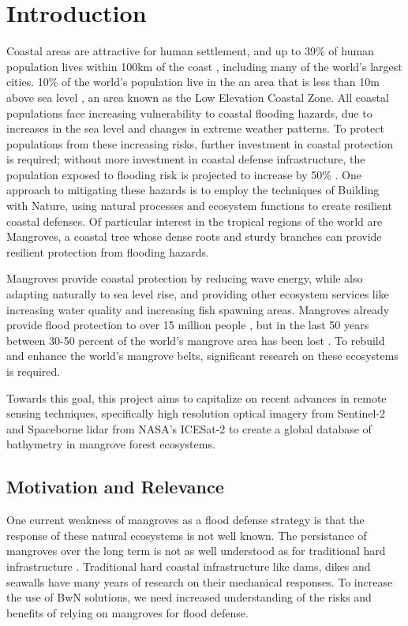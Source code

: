 \chapter{Introduction}

Coastal areas are attractive for human settlement, and up to 39\% of human population lives within 100km of the coast \parencite{Magdalena2021}, including many of the world's largest cities. 10\% of the world's population live in the an area that is less than 10m above sea level \parencite{Neumann2015,Lichter2011}, an area known as the Low Elevation Coastal Zone. All coastal populations face increasing vulnerability to coastal flooding hazards, due to increases in the sea level and changes in extreme weather patterns. To protect populations from these increasing risks, further investment in coastal protection is required; without more investment in coastal defense infrastructure, the population exposed to flooding risk is projected to increase by 50\% \Parencite{Kirezci2020}. One approach to mitigating these hazards is to employ the techniques of Building with Nature, using natural processes and ecosystem functions to create resilient coastal defenses. Of particular interest in the tropical regions of the world are Mangroves, a coastal tree whose dense roots and sturdy branches can provide resilient protection from flooding hazards.

Mangroves provide coastal protection by reducing wave energy, while also adapting naturally to sea level rise, and providing other ecosystem services like increasing water quality and increasing fish spawning areas. Mangroves already provide flood protection to over 15 million people \parencite{Menendez2020}, but in the last 50 years between 30-50 percent of the world's mangrove area has been lost \parencite{Goldberg2020}. To rebuild and enhance the world's mangrove belts, significant research on these ecosystems is required.

Towards this goal, this project aims to capitalize on recent advances in remote sensing techniques, specifically high resolution optical imagery from Sentinel-2 and Spaceborne lidar from NASA's ICESat-2 to create a global database of bathymetry in mangrove forest ecosystems.

\section{Motivation and Relevance}

One current weakness of mangroves as a flood defense strategy is that the response of these natural ecosystems is not well known. The persistance of mangroves over the long term is not as well understood as for traditional hard infrastructure \parencite{Gijsman2021}. Traditional hard coastal infrastructure like dams, dikes and seawalls have many years of research on their mechanical responses. To increase the use of BwN solutions, we need increased understanding of the risks and benefits of relying on mangroves for flood defense.

